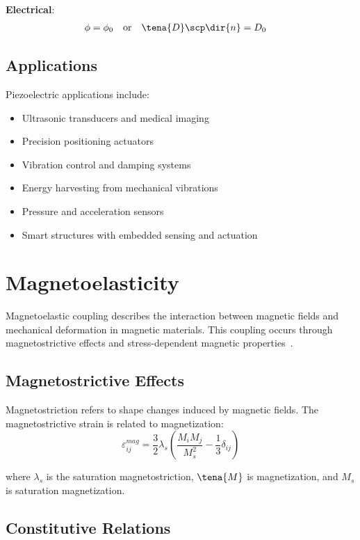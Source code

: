 \textbf{Electrical}:
\begin{align}
\phi &= \phi_0 \quad \text{or} \quad \tena{D} \scp \dir{n} = D_0
\end{align}

\subsection{Applications}

Piezoelectric applications include:
\begin{itemize}
\item Ultrasonic transducers and medical imaging
\item Precision positioning actuators
\item Vibration control and damping systems
\item Energy harvesting from mechanical vibrations
\item Pressure and acceleration sensors
\item Smart structures with embedded sensing and actuation
\end{itemize}

\section{Magnetoelasticity}

Magnetoelastic coupling describes the interaction between magnetic fields and mechanical deformation in magnetic materials. This coupling occurs through magnetostrictive effects and stress-dependent magnetic properties~\autocite{Sadd.2019}.

\subsection{Magnetostrictive Effects}

Magnetostriction refers to shape changes induced by magnetic fields. The magnetostrictive strain is related to magnetization:
\begin{equation}
\varepsilon_{ij}^{mag} = \frac{3}{2}\lambda_s \left(\frac{M_i M_j}{M_s^2} - \frac{1}{3}\delta_{ij}\right)
\end{equation}

where $\lambda_s$ is the saturation magnetostriction, $\tena{M}$ is magnetization, and $M_s$ is saturation magnetization.

\subsection{Constitutive Relations}

